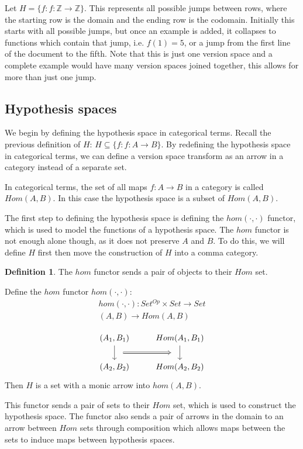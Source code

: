 \documentclass{article}
\theoremstyle{definition}
\newtheorem{definition}{Definition}[section]
\begin{document}
Let $H = \{f: f: \mathbb{Z} \rightarrow \mathbb{Z}\}$. This represents all possible jumps between rows, where the starting row is the domain and the ending row is the codomain. Initially this starts with all possible jumps, but once an example is added, it collapses to functions which contain that jump, i.e. $f(1) = 5$, or a jump from the first line of the document to the fifth. Note that this is just one version space and a complete example would have many version spaces joined together, this allows for more than just one jump. 


\subsection{Hypothesis spaces}
We begin by defining the hypothesis space in categorical terms. Recall the previous definition of $H$: $H\subseteq \{f: f: A \rightarrow B\}$.
By redefining the hypothesis space in categorical terms, we can define a version space transform as an arrow in a category instead of a separate set. 

In categorical terms, the set of all maps $f: A \rightarrow B$ in a category is called $Hom(A,B)$. In this case the hypothesis space is a subset of $Hom(A,B)$. 

The first step to defining the hypothesis space is defining the $hom(\cdot, \cdot)$ functor, which is used to model the functions of a hypothesis space. The $hom$ functor is not enough alone though, as it does not preserve $A$ and $B$. To do this, we will define $H$ first then move the construction of $H$ into a comma category.

\begin{definition}
The $hom$ functor sends a pair of objects to their $Hom$ set. 

Define the $hom$ functor $hom(\cdot,\cdot)$:
\begin{gather*}
    hom(\cdot,\cdot):Set^{Op} \times Set \rightarrow Set \\
    (A,B) \rightarrow Hom(A,B) \\
\end{gather*}
\[\begin{tikzcd}
	{(A_1, B_1)} & {Hom(A_1, B_1)} \\
	{(A_2,B_2)} & {Hom(A_2,B_2)}
	\arrow[""{name=0, anchor=center, inner sep=0}, from=1-2, to=2-2]
	\arrow[""{name=1, anchor=center, inner sep=0}, from=1-1, to=2-1]
	\arrow[shorten <=10pt, shorten >=10pt, Rightarrow, from=1, to=0]
\end{tikzcd}\]
Then $H$ is a set with a monic arrow into $hom(A,B)$.
\end{definition}
This functor sends a pair of sets to their $Hom$ set, which is used to construct the hypothesis space. The functor also sends a pair of arrows in the domain to an arrow between $Hom$ sets through composition which allows maps between the sets to induce maps between hypothesis spaces. 
\end{document}
